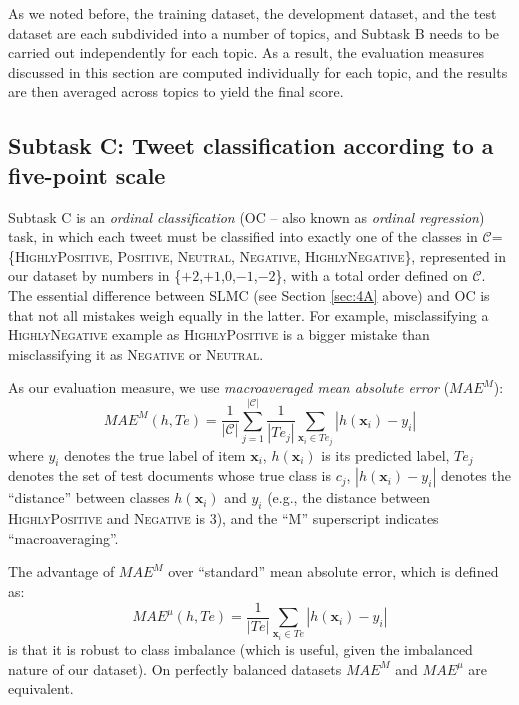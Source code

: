 \documentclass[11pt,letterpaper]{article}
\begin{document}
As we noted before, the training dataset, the development dataset, and the test
dataset are each subdivided into a number of topics, and Subtask B
needs to be carried out independently for each topic. As a result, the
evaluation measures discussed in this section are computed
individually for each topic, and the results are then averaged across
topics to yield the final score.


\subsection{Subtask C: Tweet classification according to a five-point
scale}
\label{sec:4C}

\noindent Subtask C is an \emph{ordinal classification} (OC -- also
known as \emph{ordinal regression}) task, in which each tweet must be
classified into exactly one of the classes in
$\mathcal{C}$=\{\textsc{HighlyPositive}, \textsc{Positive},
\textsc{Neutral}, \textsc{Negative}, \textsc{HighlyNegative}\},
represented in our dataset by numbers in \{$+2$,$+1$,$0$,$-1$,$-2$\}, with a
total order defined on $\mathcal{C}$. The essential difference between
SLMC (see Section \ref{sec:4A} above) and OC is that not all mistakes weigh
equally in the latter. For example, misclassifying a
\textsc{HighlyNegative} example as \textsc{HighlyPositive} is a bigger
mistake than misclassifying it as \textsc{Negative} or \textsc{Neutral}.

As our evaluation measure, we use \emph{macroaveraged mean absolute
error} ($MAE^{M}$):
%
\begin{equation}
  \label{eq:macroMAE}MAE^{M}(h,Te) =
  \frac{1}{|\mathcal{C}|}\sum_{j=1}^{|\mathcal{C}|}\frac{1}{|Te_{j}|}\sum_{\mathbf{x}_{i}\in
  Te_{j}}|h(\mathbf{x}_{i})-y_{i}| \nonumber
\end{equation}
%
\noindent where $y_{i}$ denotes the true label of item
$\mathbf{x}_{i}$, $h(\mathbf{x}_{i})$ is its predicted label,
$Te_{j}$ denotes the set of test documents whose true class is
$c_{j}$, $|h(\mathbf{x}_{i})-y_{i}|$ denotes the ``distance'' between
classes $h(\mathbf{x}_{i})$ and $y_{i}$ (e.g., the distance between
\textsc{HighlyPositive} and \textsc{Negative} is 3), and the ``M''
superscript indicates ``macroaveraging''.

The advantage of $MAE^{M}$ over ``standard'' mean absolute error,
which is defined as:
%
\begin{equation}\label{eq:microMAE}MAE^{\mu}(h,Te)=\frac{1}{
  |Te|}\sum_{\mathbf{x}_{i}\in
  Te}|h(\mathbf{x}_{i})-y_{i}|\end{equation}
% 
\noindent is that it is robust to class imbalance (which is
useful, given the imbalanced nature of our dataset). On perfectly
balanced datasets $MAE^{M}$ and $MAE^{\mu}$ are equivalent.
\end{document}
